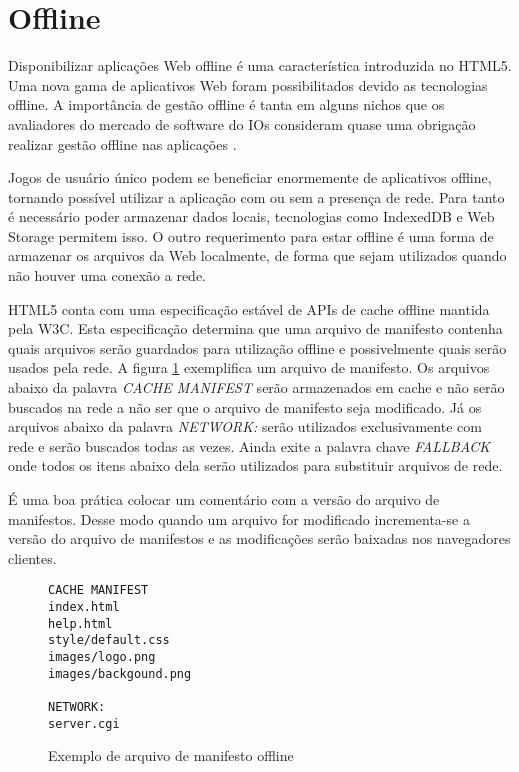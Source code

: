 \section{Offline}
Disponibilizar aplicações Web offline é uma característica
introduzida no HTML5. Uma nova gama de aplicativos Web foram
possibilitados devido as tecnologias offline. A importância de gestão
offline é tanta em alguns nichos que os avaliadores do mercado
de software do IOs consideram quase uma obrigação realizar gestão 
offline nas aplicações \autocite{publishHtml5}.

Jogos de usuário único podem se beneficiar enormemente de aplicativos
offline, tornando possível utilizar a aplicação com ou sem a
presença de rede. Para tanto é necessário poder armazenar dados
locais, tecnologias como IndexedDB e Web Storage permitem isso. O outro
requerimento para estar offline é uma forma de armazenar os arquivos
da Web localmente, de forma que sejam utilizados quando não houver uma
conexão a rede.

HTML5 conta com uma especificação estável de APIs de cache offline
mantida pela W3C. Esta especificação determina que uma arquivo de
manifesto contenha quais arquivos serão guardados para utilização
offline e possivelmente quais serão usados pela rede. A figura
\ref{fig:offline} exemplifica um arquivo de manifesto. Os arquivos
abaixo da palavra \textit{CACHE MANIFEST} serão armazenados em cache e
não serão buscados na rede a não ser que o arquivo de manifesto seja
modificado. Já os arquivos abaixo da palavra \textit{NETWORK:} serão
utilizados exclusivamente com rede e serão buscados todas as vezes.
Ainda exite a palavra chave \textit{FALLBACK} onde todos os itens abaixo
dela serão utilizados para substituir arquivos de rede.

É uma boa prática colocar um comentário com a versão do arquivo de
manifestos. Desse modo quando um arquivo for modificado incrementa-se a
versão do arquivo de manifestos e as modificações serão baixadas nos
navegadores clientes.

\begin{figure}[H]
\centering
\begin{verbatim}
CACHE MANIFEST
index.html
help.html
style/default.css
images/logo.png
images/backgound.png

NETWORK:
server.cgi
\end{verbatim}
\caption{Exemplo de arquivo de manifesto offline}
\label{fig:offline}
\end{figure}

